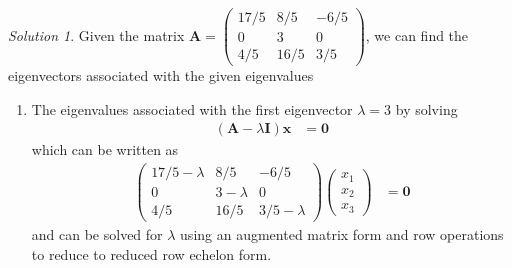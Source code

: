 \documentclass[
]{book}
\providecommand{\tightlist}{%
  \setlength{\itemsep}{0pt}\setlength{\parskip}{0pt}}
\theoremstyle{definition}
\theoremstyle{definition}
\theoremstyle{definition}
\theoremstyle{definition}
\theoremstyle{remark}
\newtheorem*{solution}{Solution}
\begin{document}
\begin{solution}

Given the matrix \(\mathbf{A} = \begin{pmatrix} 17/5 & 8/5 & -6/5 \\ 0 & 3 & 0 \\ 4/5 & 16/5 & 3/5 \end{pmatrix}\), we can find the eigenvectors associated with the given eigenvalues

\begin{enumerate}
\def\labelenumi{\alph{enumi})}
\tightlist
\item
  The eigenvalues associated with the first eigenvector \(\lambda = 3\) by solving
  \[
  \begin{aligned}
  \left( \mathbf{A} - \lambda \mathbf{I} \right) \mathbf{x} & = \mathbf{0}
  \end{aligned}
  \]
  which can be written as
  \[
  \begin{aligned}
  \begin{pmatrix} 
  17/5  - \lambda & 8/5 & -6/5 \\
  0 & 3 - \lambda & 0 \\
  4/5 & 16/5 & 3/5 - \lambda
  \end{pmatrix} \begin{pmatrix} x_1 \\ x_2 \\ x_3 \end{pmatrix} & = \mathbf{0}
  \end{aligned}
  \]
  and can be solved for \(\lambda\) using an augmented matrix form and row operations to reduce to reduced row echelon form.
\end{enumerate}


\end{solution}
\end{document}
